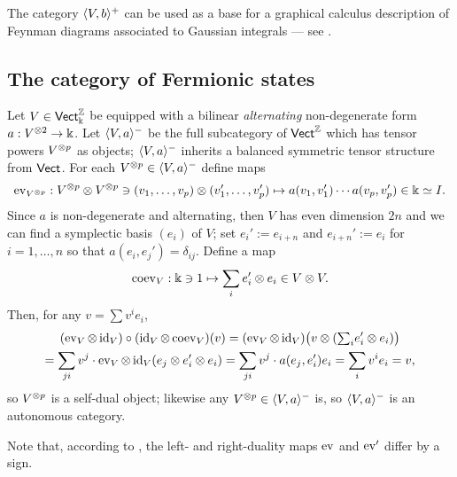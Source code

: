 The category $\btpc{V,b}$ can be used as a base for a graphical
calculus description of Feynman diagrams associated to Gaussian
integrals --- see \cite[sec.\
2.8]{murri-fiorenza;feynman}.


\subsection{The category of Fermionic states}
\label{sec:fermionic}

Let $V \in \catVect[\fk]^\setZ$ be equipped with a bilinear \emph{alternating}
non-degenerate form $a: V\tp{2} \to \fk$. Let $\ftpc{V,a}$ be the full
subcategory of $\catVect^\setZ$ which has tensor powers $V\tp{p}$ as
objects; $\ftpc{V,a}$ inherits a balanced symmetric tensor structure
from $\catVect$. For each $V\tp{p} \in \ftpc{V,a}$ define maps
\begin{equation*}
  \ev_{V\tp{p}}: V\tp{p} \otimes V\tp{p} \ni (v_1, \ldots, v_p) \otimes (v'_1, \ldots, v'_p) \mapsto
  a(v_1, v'_1) \cdots a(v_p, v'_p) \in \fk \simeq I.
\end{equation*}
Since $a$ is non-degenerate and alternating, then $V$ has even
dimension $2n$ and we can find a symplectic basis $(e_i)$  of
$V$; set $e_i' := e_{i+n}$  and $e_{i+n}' := e_i$ for $i = 1, \ldots, n$
so that $a(e_i, e_j')= \delta_{ij}$. Define a map
\begin{equation*}
  \coev_V : \fk \ni 1 \mapsto \sum_i e_i' \otimes e_i \in V \otimes V.
\end{equation*}
Then, for any $v = \sum v^i e_i$,
\begin{multline*}
  (\ev_V \otimes \id_V) \circ (\id_V \otimes \coev_V) (v) 
  = (\ev_V \otimes \id_V) \bigl(v \otimes ( {\textstyle \sum_i} e_i' \otimes e_i) \bigr)
  \\
  = \sum_{ji} v^j \cdot \ev_V \otimes \id_V (e_j \otimes e_i' \otimes e_i)
  = \sum_{ji} v^j \cdot a(e_j, e_i') e_i
  = \sum_i v^i e_i = v  ,
\end{multline*}
so $V\tp{p}$ is a self-dual object; likewise any $V\tp{p} \in
\ftpc{V,a}$ is, so $\ftpc{V,a}$ is an autonomous category.

Note that, according to , the left- and
right-duality maps $\ev$ and $\ev'$ differ by a sign.



